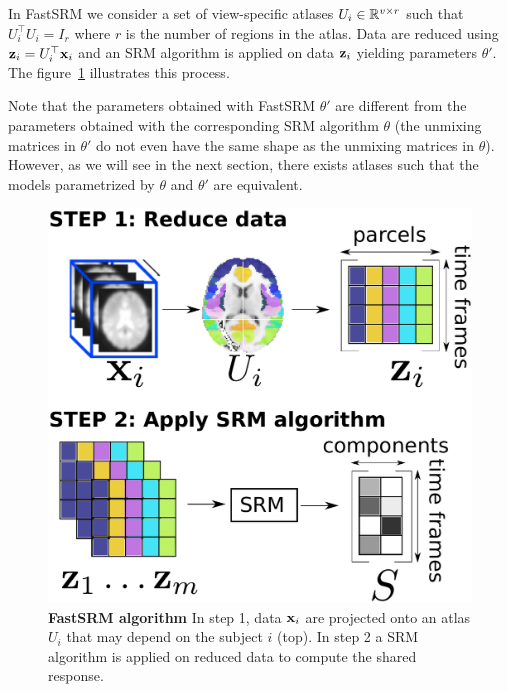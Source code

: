 \documentclass{article}
\begin{document}
In FastSRM we consider a set of view-specific atlases $U_i \in \mathbb{R}^{v \times r}$ such that
$U_i^{\top}U_i = I_r$ where $r$ is the number of regions in the atlas.
%
Data are reduced using $\mathbf{z}_i = U_i^{\top} \mathbf{x}_i$ and an SRM algorithm is applied
on data $\mathbf{z}_i$ yielding parameters $\theta'$.
%
The figure~\ref{fig:srm:conceptual} illustrates this process.
%


Note that the parameters obtained with FastSRM $\theta'$ are different
from the parameters obtained with the corresponding SRM algorithm $\theta$ (the
unmixing matrices in $\theta'$ do not even have the same shape as the unmixing
matrices in $\theta$).
%
However, as we will see in the next section, there exists atlases such that the
models parametrized by $\theta$ and
$\theta'$ are equivalent.
%


\begin{figure}
  \centering
  \includegraphics[scale=0.34]{figures/srm/conceptual_figure2.pdf}
  \caption{\textbf{FastSRM algorithm} In step 1, data $\mathbf{x}_i$ are projected onto an
    atlas $U_i$ that may depend on the subject $i$ (top).
    In step 2 a SRM algorithm is applied on reduced data to compute the shared
    response.
  }
  \label{fig:srm:conceptual}
\end{figure}
\end{document}
